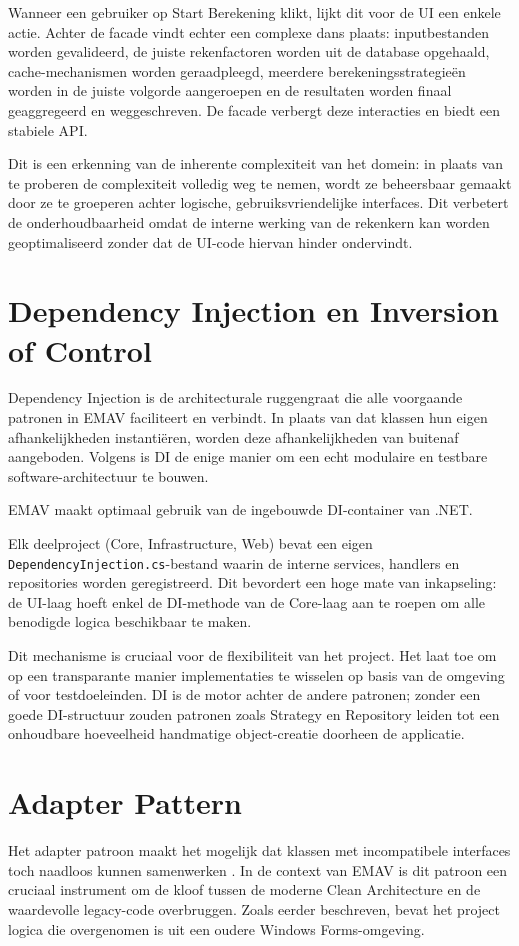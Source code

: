 Wanneer een gebruiker op Start Berekening klikt, lijkt dit voor de UI een enkele actie. 
Achter de facade vindt echter een complexe dans plaats: inputbestanden worden gevalideerd, de juiste rekenfactoren worden uit de database opgehaald, cache-mechanismen worden geraadpleegd, meerdere berekeningsstrategieën worden in de juiste volgorde aangeroepen en de resultaten worden finaal geaggregeerd en weggeschreven. 
De facade verbergt deze interacties en biedt een stabiele API.

Dit is een erkenning van de inherente complexiteit van het domein: in plaats van te proberen de complexiteit volledig weg te nemen, wordt ze beheersbaar gemaakt door ze te groeperen achter logische, gebruiksvriendelijke interfaces. Dit verbetert de onderhoudbaarheid omdat de interne werking van de rekenkern kan worden geoptimaliseerd zonder dat de UI-code hiervan hinder ondervindt.

\section{Dependency Injection en Inversion of Control}
{\sloppy Dependency Injection is de architecturale ruggengraat die alle voorgaande patronen in EMAV faciliteert en verbindt. In plaats van dat klassen hun eigen afhankelijkheden instantiëren, worden deze afhankelijkheden van buitenaf aangeboden. Volgens \textcite{seemann2019di} is DI de enige manier om een echt modulaire en testbare software-architectuur te bouwen.\par}

EMAV maakt optimaal gebruik van de ingebouwde DI-container van .NET. 
{\sloppy Elk deelproject (Core, Infrastructure, Web) bevat een eigen \nolinkurl{DependencyInjection.cs}-bestand waarin de interne services, handlers en repositories worden geregistreerd. Dit bevordert een hoge mate van inkapseling: de UI-laag hoeft enkel de DI-methode van de Core-laag aan te roepen om alle benodigde logica beschikbaar te maken.\par}

Dit mechanisme is cruciaal voor de flexibiliteit van het project. 
Het laat toe om op een transparante manier implementaties te wisselen op basis van de omgeving of voor testdoeleinden. 
DI is de motor achter de andere patronen; zonder een goede DI-structuur zouden patronen zoals Strategy en Repository leiden tot een onhoudbare hoeveelheid handmatige object-creatie doorheen de applicatie.

\section{Adapter Pattern}
Het adapter patroon maakt het mogelijk dat klassen met incompatibele interfaces toch naadloos kunnen samenwerken \autocite{gof1994}. 
In de context van EMAV is dit patroon een cruciaal instrument om de kloof tussen de moderne Clean Architecture en de waardevolle legacy-code overbruggen. 
Zoals eerder beschreven, bevat het project logica die overgenomen is uit een oudere Windows Forms-omgeving.

